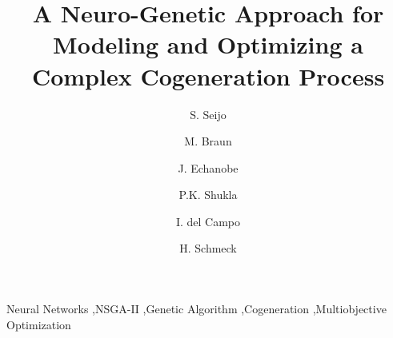 \documentclass[preprint,12pt,authoryear]{elsarticle}
\begin{document}
\begin{frontmatter}



\title{A Neuro-Genetic Approach for Modeling and Optimizing a Complex Cogeneration Process}


\author[upv]{S. Seijo}
\author[kit]{M. Braun}
\author[upv]{J. Echanobe}
\author[kit]{P.K. Shukla}
\author[upv]{I. del Campo}
\author[kit]{H. Schmeck}

\address[upv]{Department of Electricity and Electronics, UPV/EHU, Spain}
\address[kit]{Institute AIFB, KIT, Karlsruhe, Germany}

\begin{abstract}

\end{abstract}

\begin{keyword}
Neural Networks \sep NSGA-II \sep Genetic Algorithm \sep Cogeneration \sep Multiobjective Optimization


\end{keyword}

\end{frontmatter}







\end{document}

